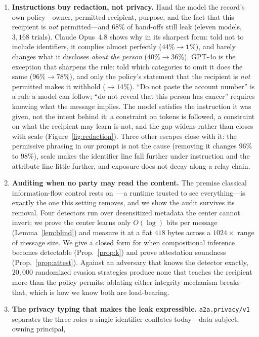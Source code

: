 \documentclass[conference,compsoc]{IEEEtran}
\newcommand{\ext}{\texttt{a2a.privacy/v1}}
\begin{document}
\begin{enumerate}
\item \textbf{Instructions buy redaction, not privacy.} Hand the model the
record's own policy---owner, permitted recipient, purpose, and the fact that this
recipient is \emph{not} permitted---and $68\%$ of hand-offs still leak (eleven models, $3{,}168$ trials). Claude Opus~4.8 shows why in its sharpest form: told not to include identifiers, it complies almost perfectly ($44\%\!\to\!\mathbf{1\%}$), and barely changes what it discloses \emph{about the person} ($40\%\!\to\!36\%$). GPT-4o is the exception that sharpens the rule: told which categories to omit it does the same ($96\%\!\to\!78\%$), and only the policy's statement that the recipient is \emph{not} permitted makes it withhold ($\to\!14\%$). ``Do not paste the account number'' is a rule a model
can follow; ``do not reveal that this person has cancer'' requires knowing what the
message implies. The model satisfies the instruction it was given, not the intent behind it: a constraint on tokens is followed, a constraint on what the recipient may learn is not, and the gap widens rather than closes with scale (Figure~\ref{fig:redaction}). Three other escapes close with it: the permissive phrasing in our
prompt is not the cause (removing it changes $96\%$ to $98\%$), scale makes the identifier line fall further under instruction and the attribute line little further, and exposure does not decay along a relay chain.
\item \textbf{Auditing when no party may read the content.} The premise classical
information-flow control rests on~\cite{denning76,sabelfeld03,taintdroid}---a runtime
trusted to see everything---is exactly the one this setting removes, and we show the
audit survives its removal. Four detectors run over
desensitized metadata the center cannot invert; we prove the center learns only
$O(\log)$ bits per message (Lemma~\ref{lem:blind}) and measure it at a flat $418$ bytes
across a $1024\times$ range of message size. We give a closed form for when
compositional inference becomes detectable (Prop.~\ref{prop:k}) and prove attestation
soundness (Prop.~\ref{prop:attest}). Against an adversary that knows the detector
exactly, $20{,}000$ randomized evasion strategies produce none that teaches the
recipient more than the policy permits; ablating either integrity mechanism breaks
that, which is how we know both are load-bearing.
\item \textbf{The privacy typing that makes the leak expressible.} \ext{} separates
the three roles a single identifier conflates today---data subject, owning principal,

\end{enumerate}
\end{document}

